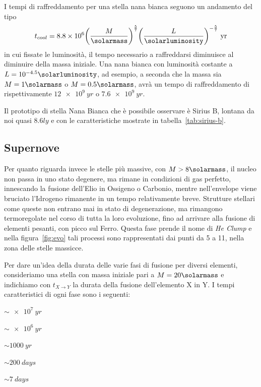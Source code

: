 I tempi di raffreddamento per una stella nana bianca seguono un andamento del tipo
\begin{equation}
    t_{cool} = 8.8\times 10^6 {\left(\frac{M}{\si{\solarmass}} \right)}^{\frac{5}{7}} {\left( \frac{L}{\si{\solarluminosity}} \right)}^{-\frac{5}{7}} \mbox{ yr}
\end{equation}
in cui fissate le luminosità, il tempo necessario a raffreddarsi diminuisce al diminuire della massa iniziale. Una nana bianca con luminosità costante a $L = 10^{-4.5} \si{\solarluminosity}$, ad esempio, a seconda che la massa sia $M = 1\si{\solarmass}$ o $M = 0.5 \si{\solarmass}$, avrà un tempo di raffreddamento di rispettivamente $\SI{12e9}{yr}$ o $\SI{7.6e9}{yr}$.

Il prototipo di stella Nana Bianca che è possibile osservare è Sirius B, lontana da noi quasi $8.6 \si{ly}$ e con le caratteristiche mostrate in tabella~\ref{tab:sirius-b}.

\subsection{Supernove}\label{sec:supernove}
Per quanto riguarda invece le stelle più massive, con $M > 8 \si{\solarmass}$, il nucleo non passa in uno stato degenere, ma rimane in condizioni di gas perfetto, innescando la fusione dell'Elio in Ossigeno o Carbonio, mentre nell'envelope viene bruciato l'Idrogeno rimanente in un tempo relativamente breve. Strutture stellari come queste non entrano mai in stato di degenerazione, ma rimangono termoregolate nel corso di tutta la loro evoluzione, fino ad arrivare alla fusione di elementi pesanti, con picco sul Ferro. Questa fase prende il nome di \textit{He Clump} e nella figura~\ref{fig:evo} tali processi sono rappresentati dai punti da 5 a 11, nella zona delle stelle massicce.

Per dare un'idea della durata delle varie fasi di fusione per diversi elementi, consideriamo una stella con massa iniziale pari a $M = 20\si{\solarmass}$ e indichiamo con $t_{X \rightarrow Y}$ la durata della fusione dell'elemento X in Y. I tempi caratteristici di ogni fase sono i seguenti:
\begin{description}
    \centering
    \item[$t_{H \rightarrow He}$] $\sim \SI{e7}{yr}$
    \item[$t_{He \rightarrow C}$] $\sim \SI{e6}{yr}$
    \item[$t_{C \rightarrow O}$] $\sim \SI{1000}{yr}$
    \item[$t_{O}$] $\sim \SI{200}{days}$
    \item[$t_{Si}$] $\sim \SI{7}{days}$
\end{description}

